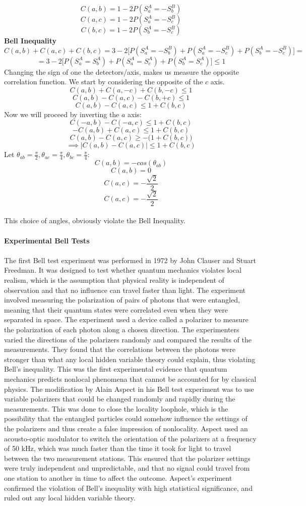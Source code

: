 \documentclass{article}
\begin{document}
$$C(a,b) = 1-2P(S_a^A=-S_b^B)$$
$$C(a,c) = 1-2P(S_a^A=-S_c^B)$$
$$C(b,c) = 1-2P(S_b^A=-S_c^B)$$
\textbf{Bell Inequality}
$$C(a,b)+C(a,c)+C(b,c) = 3-2\bigl[ P(S_a^A=-S_b^B)+P(S_a^A=-S_c^B) + P(S_b^A=-S_c^B) \bigl] =  $$
$$= 3 -2 \bigl[ P(S_a^A=S_b^A)+P(S_a^A=S_c^A)+P(S_b^A=S_c^A)  \bigl] \leq 1$$
Changing the sign of one the detectors/axis, makes us measure the opposite correlation function. We start by considering the opposite of the $c$ axis.
$$C(a,b)+C(a,-c)+C(b,-c) \leq 1$$
$$C(a,b)-C(a,c)-C(b,+c) \leq 1$$
$$C(a,b)-C(a,c) \leq 1+ C(b,c)$$
Now we will proceed by inverting the $a$ axis:
$$C(-a,b)-C(-a,c) \leq 1 + C(b,c)$$
$$-C(a,b)+C(a,c) \leq 1 + C(b,c)$$
$$ C(a,b)-C(a,c) \geq - \bigl(1+ C(b,c)\bigl)$$
$$\implies | C(a,b)-C(a,c) | \leq 1+ C(b,c) $$
Let $\theta_{ab} = \frac{\pi}{2}, \theta_{ac} = \frac{\pi}{4}, \theta_{bc} = \frac{\pi}{4}$:
$$C(a,b) = -cos(\theta_{ab})$$
$$C(a,b) = 0$$
$$C(a,c) = -\frac{\sqrt{2}}{2}$$
$$C(a,c) = -\frac{\sqrt{2}}{2}$$\\
This choice of angles, obviously violate the Bell Inequality.\\ \\
\textbf{Experimental Bell Tests}\\ \\
The first Bell test experiment was performed in 1972 by John Clauser and Stuart Freedman. It was designed to test whether quantum mechanics violates local realism, which is the assumption that physical reality is independent of observation and that no influence can travel faster than light. The experiment involved measuring the polarization of pairs of photons that were entangled, meaning that their quantum states were correlated even when they were separated in space. The experiment used a device called a polarizer to measure the polarization of each photon along a chosen direction. The experimenters varied the directions of the polarizers randomly and compared the results of the measurements. They found that the correlations between the photons were stronger than what any local hidden variable theory could explain, thus violating Bell’s inequality. This was the first experimental evidence that quantum mechanics predicts nonlocal phenomena that cannot be accounted for by classical physics.
The modification by Alain Aspect in his Bell test experiment was to use variable polarizers that could be changed randomly and rapidly during the measurements. This was done to close the locality loophole, which is the possibility that the entangled particles could somehow influence the settings of the polarizers and thus create a false impression of nonlocality. Aspect used an acousto-optic modulator to switch the orientation of the polarizers at a frequency of 50 kHz, which was much faster than the time it took for light to travel between the two measurement stations. This ensured that the polarizer settings were truly independent and unpredictable, and that no signal could travel from one station to another in time to affect the outcome. Aspect's experiment confirmed the violation of Bell's inequality with high statistical significance, and ruled out any local hidden variable theory.\\ \\
\end{document}
